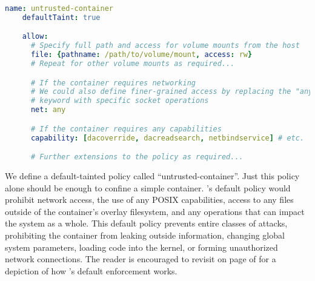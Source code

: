 
\begin{lstlisting}[language=yaml, gobble=4,
  caption={[Confining an untrusted container with \bpfcontain{}]
    Confining an untrusted container with \bpfcontain{}.
    Note that this policy requires some extensions on top of the existing \bpfcontain{}
    model, such as instrumenting the Docker container runtime.
  },
  label={lst:bpfcontain-untrusted}, float=false]
    name: untrusted-container
    defaultTaint: true

    allow:
      # Specify full path and access for volume mounts from the host
      file: {pathname: /path/to/volume/mount, access: rw}
      # Repeat for other volume mounts as required...

      # If the container requires networking
      # We could also define finer-grained access by replacing the "any"
      # keyword with specific socket operations
      net: any

      # If the container requires any capabilities
      capability: [dacoverride, dacreadsearch, netbindservice] # etc.

      # Further extensions to the policy as required...
\end{lstlisting}

We define a default-tainted \bpfcontain{} policy called \enquote{untrusted-container}.
Just this policy alone should be enough to confine a simple container. \bpfcontain{}'s
default policy would prohibit network access, the use of any POSIX capabilities, access to
any files outside of the container's overlay filesystem, and any operations that can
impact the system as a whole. This default policy prevents entire classes of attacks,
prohibiting the container from leaking outside information, changing global system
parameters, loading code into the kernel, or forming unauthorized network connections. The
reader is encouraged to revisit  on page
\pageref{fig:bpfcontain-enforcement} of  for a depiction of how
\bpfcontain{}'s default enforcement works.


